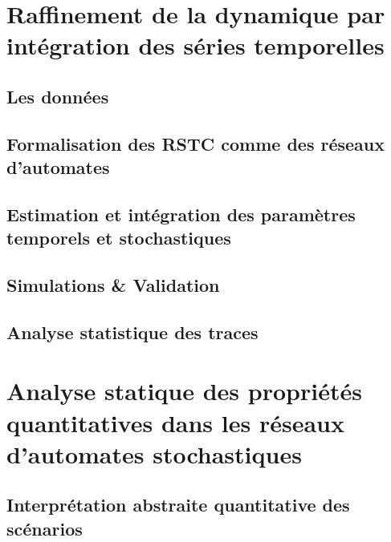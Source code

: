 \documentclass[fleqn,10pt,c]{beamer}
\begin{document}
\section{Raffinement de la dynamique par intégration des séries temporelles}
 
 
 \subsection{Les données}
 
 

 \subsection{Formalisation des RSTC comme des réseaux d'automates}
 

 \subsection{Estimation et intégration des paramètres temporels et stochastiques}
 
 
 
 \subsection{Simulations \& Validation}
 
 
  
 \subsection{Analyse statistique des traces}
  
 




\section{Analyse statique des propriétés quantitatives dans les réseaux d'automates stochastiques}

 
 \subsection{Interprétation abstraite quantitative des scénarios}
 
\end{document}
